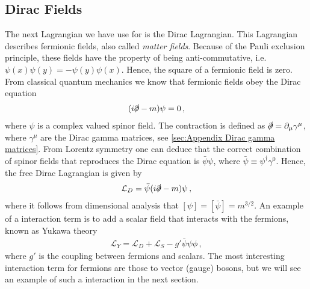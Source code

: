 \subsection*{Dirac Fields}
The next Lagrangian we have use for is the Dirac Lagrangian. This Lagrangian describes fermionic fields, also called \emph{matter fields}. Because of the Pauli exclusion principle, these fields have the property of being anti-commutative, i.e. $\psi(x)\psi(y)=-\psi(y)\psi(x)$. Hence, the square of a fermionic field is zero. From classical quantum mechanics we know that fermionic fields obey the Dirac equation
\begin{align}
    (i\slashed{\partial}-m)\psi=0\,,
\end{align}
where $\psi$ is a complex valued spinor field. The contraction is defined as $\slashed{\partial}=\partial_{\mu}\gamma^{\mu}$, where $\gamma^{\mu}$ are the Dirac gamma matrices, see \cref{sec:Appendix Dirac gamma matrices}. From Lorentz symmetry one can deduce that the correct combination of spinor fields that reproduces the Dirac equation is $\bar{\psi}\psi$, where $\bar{\psi}\equiv\psi
^{\dagger}\gamma^{0}$. Hence, the free Dirac Lagrangian is given by
\begin{align}\label{eq:fermionic LLL}
    \mathcal{L}_{D}=\bar{\psi}(i\slashed{\partial}-m)\psi\,,
\end{align}
where it follows from dimensional analysis that $[\psi]=[\bar{\psi}]=m^{3/2}$. An example of a interaction term is to add a scalar field that interacts with the fermions, known as Yukawa theory
\begin{align}
    \mathcal{L}_{Y}=\mathcal{L}_{D}+\mathcal{L}_{S}-g'\bar{\psi}\psi\phi\,,
\end{align}
where $g'$ is the coupling between fermions and scalars. The most interesting interaction term for fermions are those to vector (gauge) bosons, but we will see an example of such a interaction in the next section.

